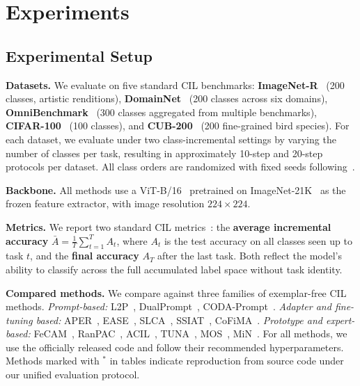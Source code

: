 \section{Experiments}
\label{sec:experiments}

\subsection{Experimental Setup}
\label{sec:exp_setup}

\noindent\textbf{Datasets.}
We evaluate on five standard CIL benchmarks:
\textbf{ImageNet-R}~\cite{hendrycks2021manyfaces} (200 classes, artistic renditions),
\textbf{DomainNet}~\cite{peng2019domainnet} (200 classes across six domains),
\textbf{OmniBenchmark}~\cite{zhang2022omnibenchmark} (300 classes aggregated from multiple benchmarks),
\textbf{CIFAR-100}~\cite{krizhevsky2009learning} (100 classes),
and \textbf{CUB-200}~\cite{wah2011cub200} (200 fine-grained bird species).
For each dataset, we evaluate under two class-incremental settings by varying the number of classes per task, resulting in approximately 10-step and 20-step protocols per dataset. All class orders are randomized with fixed seeds following~\cite{zhou2025revisiting}.

\noindent\textbf{Backbone.}
All methods use a ViT-B/16~\cite{dosovitskiy2021vit} pretrained on ImageNet-21K~\cite{ridnik2021imagenet21k} as the frozen feature extractor, with image resolution $224 \times 224$.

\noindent\textbf{Metrics.}
We report two standard CIL metrics~\cite{van2019three}: the \textbf{average incremental accuracy} $\bar{A} = \frac{1}{T}\sum_{t=1}^{T} A_t$, where $A_t$ is the test accuracy on all classes seen up to task $t$, and the \textbf{final accuracy} $A_T$ after the last task. Both reflect the model's ability to classify across the full accumulated label space without task identity.

\noindent\textbf{Compared methods.}
We compare against three families of exemplar-free CIL methods. \emph{Prompt-based:} L2P~\cite{wang2022learning}, DualPrompt~\cite{wang2022dualprompt}, CODA-Prompt~\cite{smith2023coda}. \emph{Adapter and fine-tuning based:} APER~\cite{zhou2025revisiting}, EASE~\cite{ease2024}, SLCA~\cite{slca2023}, SSIAT~\cite{tan2023ssiat}, CoFiMA~\cite{cofima2024}. \emph{Prototype and expert-based:} FeCAM~\cite{fecam2023}, RanPAC~\cite{ranpac2023}, ACIL~\cite{acil2022}, TUNA~\cite{wang2025integrating}, MOS~\cite{mos2025}, MiN~\cite{wang2024min}. For all methods, we use the officially released code and follow their recommended hyperparameters. Methods marked with $^*$ in tables indicate reproduction from source code under our unified evaluation protocol.

